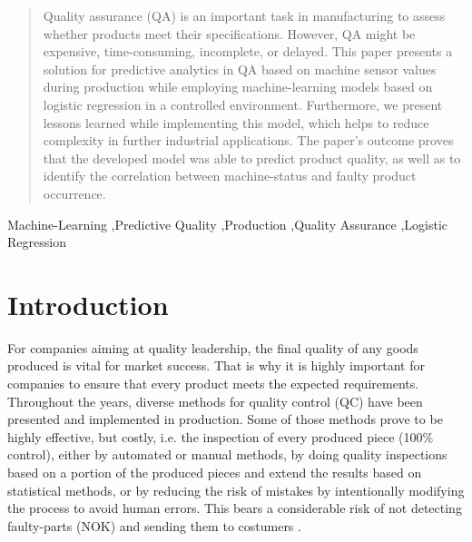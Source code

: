 \documentclass[5p,times,procedia]{elsarticle}
\begin{document}
\begin{frontmatter}
\begin{abstract}
Quality assurance (QA) is an important task in manufacturing to assess whether products 
meet their specifications. However, QA might be expensive, time-consuming, incomplete, or delayed.
This paper presents a solution for predictive analytics in QA based on machine sensor values during
production while employing machine-learning models based on logistic regression in a controlled environment. 
Furthermore, we present lessons learned while implementing this model, which helps to reduce complexity in
further industrial applications. The paper’s outcome proves that the developed model was able to predict
product quality, as well as to identify the correlation between machine-status and faulty product occurrence.
\end{abstract}

\begin{keyword}
Machine-Learning \sep Predictive Quality \sep Production \sep Quality Assurance \sep Logistic Regression 




\end{keyword}

\end{frontmatter}


\section{Introduction} %

For companies aiming at quality leadership, the final quality of any goods produced is vital for market success. That is why it is highly important for companies to ensure that every product meets the expected requirements. Throughout the years, diverse methods for quality control (QC) have been presented and implemented in production. Some of those methods prove to be highly effective, but costly, i.e. the inspection of every produced piece (100\% control), either by automated or manual methods, by doing quality inspections based on a portion of the produced pieces and extend the results based on statistical methods, or by reducing the risk of mistakes by intentionally modifying the process to avoid human errors. This bears a considerable risk of not detecting faulty-parts (NOK) and sending them to costumers \cite{fox1993quality, Robinson2011UsingPT}.
\end{document}
